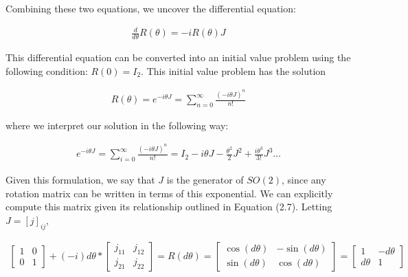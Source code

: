 Combining these two equations, we uncover the differential equation:

\begin{equation}
	\begin{aligned}
		\frac{d}{d\theta}R(\theta) = - i R(\theta)J
	\end{aligned}
\end{equation}  

This differential equation can be converted into an initial value problem using the following condition: $R(0) = I_2$. This initial value problem has the solution

\begin{equation}
	\begin{aligned}
		R(\theta) = e^{-i\theta J} = \sum_{n=0}^\infty \frac{(-i\theta J)^n}{n!}
	\end{aligned}
\end{equation}  

\noindent where we interpret our solution in the following way:

\begin{equation}
	\begin{aligned}
		e^{-i\theta J} = \sum_{i=0}^\infty \frac{\left(-i\theta J\right)^n}{n!} = I_2 -i\theta J - \frac{\theta^2}{2} J^2 + \frac{i\theta^3}{3!}J^3 \hdots 
	\end{aligned}
\end{equation}  

Given this formulation, we say that $J$ is the generator of $SO(2)$, since any rotation matrix can be written in terms of this exponential. We can explicitly compute this matrix given its relationship outlined in Equation (2.7). Letting $J = [j]_{ij}$,

\begin{equation}
	\begin{aligned}
		\begin{bmatrix}
			1 & 0 \\
			0 & 1
		\end{bmatrix} + (-i)d\theta * \begin{bmatrix}
			j_{11} & j_{12} \\
			j_{21} & j_{22}
		\end{bmatrix} = R(d\theta) = \begin{bmatrix}
			\cos(d\theta) & -\sin(d\theta) \\
			\sin(d\theta) & \cos(d\theta)
		\end{bmatrix} = 
		\begin{bmatrix}
			1 & -d\theta \\
			d\theta & 1
		\end{bmatrix}
	\end{aligned}
\end{equation}

